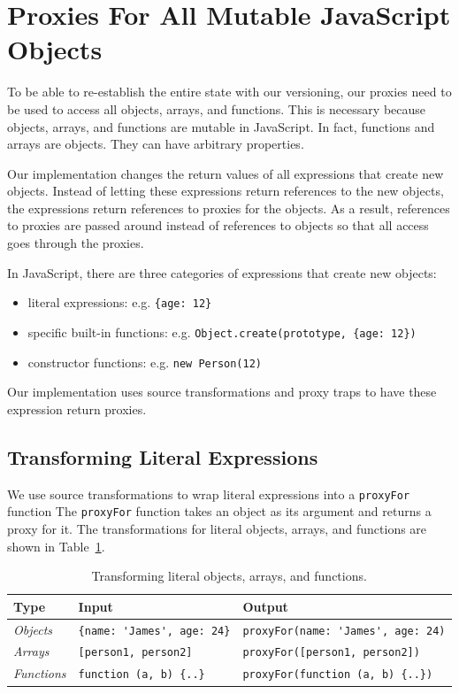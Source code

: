 \section{Proxies For All Mutable JavaScript Objects}

To be able to re-establish the entire state with our versioning, our proxies need to be used to access all objects, arrays, and functions.
This is necessary because objects, arrays, and functions are mutable in JavaScript.
In fact, functions and arrays are objects.
They can have arbitrary properties.

Our implementation changes the return values of all expressions that create new objects.
Instead of letting these expressions return references to the new objects, the expressions return references to proxies for the objects.
As a result, references to proxies are passed around instead of references to objects so that all access goes through the proxies.

In JavaScript, there are three categories of expressions that create new objects: 
\begin{itemize}
    \item literal expressions: e.g. \lstinline|{age: 12}|
    \item specific built-in functions: e.g. \lstinline|Object.create(prototype, {age: 12})|
    \item constructor functions: e.g. \lstinline|new Person(12)|
\end{itemize}

Our implementation uses source transformations and proxy traps to have these expression return proxies.


\subsection{Transforming Literal Expressions}

We use source transformations to wrap literal expressions into a \lstinline{proxyFor} function
The \lstinline{proxyFor} function takes an object as its argument and returns a proxy for it.
The transformations for literal objects, arrays, and functions are shown in Table~\ref{table:literalTransforms}.

\begin{table}[h]
\begin{center}
\begin{tabular}{| l | l | l |}
\hline
Type & Input & Output \\ \hline
\emph{Objects} & \lstinline|{name: 'James', age: 24}| & \lstinline|proxyFor(name: 'James', age: 24)| \\ \hline
\emph{Arrays} & \lstinline|[person1, person2]| & \lstinline|proxyFor([person1, person2])| \\ \hline
\emph{Functions} & \lstinline|function (a, b) {..}| & \lstinline|proxyFor(function (a, b) {..})| \\ \hline
\end{tabular}
\end{center}
\caption[Table caption text]{Transforming literal objects, arrays, and functions.}
\label{table:literalTransforms}
\end{table}

